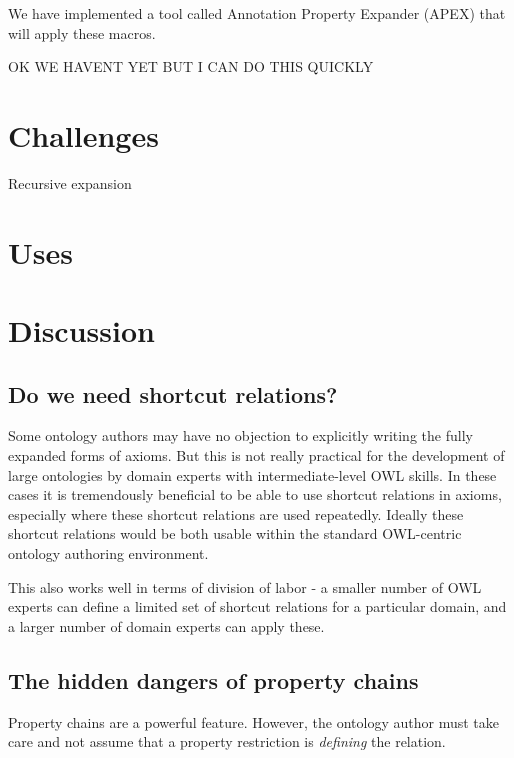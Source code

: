 \documentclass[11pt]{article}
\begin{document}
We have implemented a tool called Annotation Property Expander (APEX)
that will apply these macros.

OK WE HAVENT YET BUT I CAN DO THIS QUICKLY


\section{Challenges}

Recursive expansion


\section{Uses}


\section{Discussion}

\subsection{Do we need shortcut relations?}

Some ontology authors may have no objection to explicitly writing the
fully expanded forms of axioms. But this is not really practical for
the development of large ontologies by domain experts with
intermediate-level OWL skills. In these cases it is tremendously
beneficial to be able to use shortcut relations in axioms, especially
where these shortcut relations are used repeatedly. Ideally these
shortcut relations would be both usable within the standard
OWL-centric ontology authoring environment.

This also works well in terms of division of labor - a smaller number
of OWL experts can define a limited set of shortcut relations for a
particular domain, and a larger number of domain experts can apply
these.

\subsection{The hidden dangers of property chains}

Property chains are a powerful feature. However, the ontology author
must take care and not assume that a property restriction is
\emph{defining} the relation.
\end{document}
